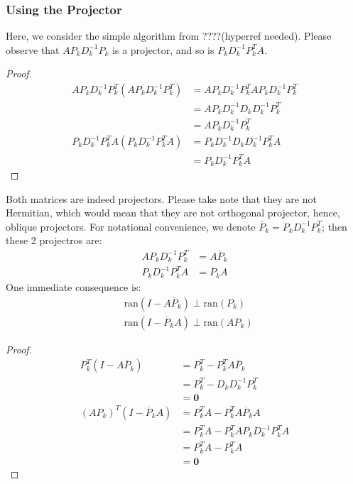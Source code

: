 \documentclass[]{article}
\theoremstyle{definition}
\begin{document}
        \subsubsection{Using the Projector}
            Here, we consider the simple algorithm from ????(hyperref needed). Please observe that $AP_kD_k^{-1}P_k$ is a projector, and so is $P_kD^{-1}_kP_k^TA$. 
            \begin{proof}
                \begin{align}
                    AP_kD^{-1}_kP_k^T(AP_kD^{-1}_kP_k^T) &= AP_kD^{-1}_kP_k^TAP_kD^{-1}_kP_k^T 
                    \\
                    &= AP_kD_k^{-1}D_kD_k^{-1}P_k^{T}
                    \\
                    &= AP_kD_k^{-1}P_k^T 
                    \\[1.1em]
                    P_kD^{-1}_kP_k^{T}A(P_kD^{-1}_kP_k^{T}A) &= P_kD^{-1}_kD_kD_{k}^{-1}P^T_kA
                    \\
                    &= 
                    P_kD^{-1}_kP^T_kA
                \end{align}
            \end{proof}
            \noindent
            Both matrices are indeed projectors. Please take note that they are not Hermitian, which would mean that they are not orthogonal projector, hence, oblique projectors. For notational convenience, we denote $\overline{P}_k = P_kD_k^{-1}P_k^{T}$; then these 2 projectros are: 
            \begin{align}
                AP_kD^{-1}_kP_k^T &= A\overline{P}_k 
                \\
                P_kD^{-1}_kP_k^TA &= \overline{P}_kA
            \end{align}
            One immediate consequence is: 
            \begin{align}
                & \text{ran}(I - A\overline{P}_k )\perp \text{ran}(P_k)
                \\
                & \text{ran}(I - \overline{P}_kA) \perp \text{ran}(AP_k)
            \end{align}
            \begin{proof}
                \begin{align}
                    P_k^T(I - A\overline{P}_k) &= P_k^T - P_k^{T}A\overline{P}_k
                    \\
                    &= P_k^{T} - D_kD_k^{-1}P^T_k
                    \\
                    &= \mathbf{0}
                    \\
                    (AP_k)^T(I - \overline{P}_kA) &=P_k^TA - P_k^TA\overline{P}_kA
                    \\
                    &= P_k^TA - P_k^TAP_kD_k^{-1}P_k^TA
                    \\
                    &= P_k^TA - P^T_kA 
                    \\
                    &= \mathbf{0}
                \end{align}
            \end{proof}
\end{document}
